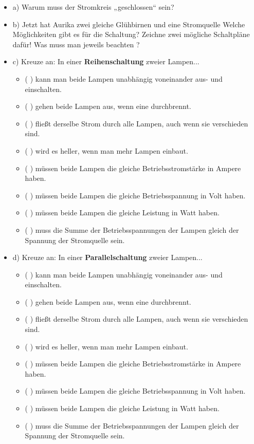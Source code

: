 \documentclass[a4paper,12pt]{article}
\begin{document}
	\begin{itemize}
		\item a) Warum muss der Stromkreis „geschlossen“ sein?
		
		\vspace{1em}
		\underline{\hspace{12cm}}
		
		\item b) Jetzt hat Aurika zwei gleiche Glühbirnen und eine Stromquelle
		Welche Möglichkeiten gibt es für die  Schaltung? Zeichne zwei mögliche Schaltpläne dafür!
		Was muss man jeweils beachten ?
		
\newpage		
		\item c) Kreuze an:  
		In einer {\bf Reihenschaltung } zweier Lampen...
		
		\begin{itemize}
			\item( ) kann man beide Lampen unabhängig voneinander aus- und einschalten.
			\item( ) gehen beide Lampen aus, wenn eine durchbrennt.
			\item( ) fließt derselbe Strom durch alle Lampen, auch wenn sie verschieden sind.
			\item( ) wird es heller, wenn man mehr Lampen einbaut.
	        \item( ) müssen beide Lampen die gleiche Betriebsstromstärke in Ampere haben.
	        \item( ) müssen beide Lampen die gleiche Betriebsspannung in Volt haben.
	        \item( ) müssen beide Lampen die gleiche Leistung  in Watt haben.
	        \item( ) muss die Summe der Betriebsspannungen der Lampen gleich der Spannung der Stromquelle sein.
		\end{itemize}
		
		\item d) Kreuze an:  
		In einer {\bf Parallelschaltung } zweier Lampen...
		
		\begin{itemize}
			\item( ) kann man beide Lampen unabhängig voneinander aus- und einschalten.
			\item( ) gehen beide Lampen aus, wenn eine durchbrennt.
			\item( ) fließt derselbe Strom durch alle Lampen, auch wenn sie verschieden sind.
			\item( ) wird es heller, wenn man mehr Lampen einbaut.
			 \item( ) müssen beide Lampen die gleiche Betriebsstromstärke in Ampere haben.
			\item( ) müssen beide Lampen die gleiche Betriebsspannung in Volt haben.
			\item( ) müssen beide Lampen die gleiche Leistung  in Watt haben.
			\item( ) muss die Summe der Betriebsspannungen der Lampen gleich der Spannung der Stromquelle sein.
		\end{itemize}
		

\end{itemize}
\end{document}

